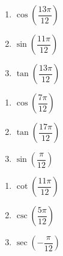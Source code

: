 \begin{multicols}{3}

\begin{enumerate}

\setcounter{enumi}{\value{HW}}

\item  $\cos\left(\dfrac{13\pi}{12}\right)$
\item  $\sin\left(\dfrac{11\pi}{12}\right)$
\item  $\tan\left(\dfrac{13\pi}{12}\right)$

\setcounter{HW}{\value{enumi}}

\end{enumerate}

\end{multicols}

\begin{multicols}{3}

\begin{enumerate}

\setcounter{enumi}{\value{HW}}

\item \label{cos7pi12} $\cos \left( \dfrac{7\pi}{12} \right)$
\item $\tan \left( \dfrac{17\pi}{12} \right)$
\item \label{sinpi12} $\sin \left( \dfrac{\pi}{12} \right)$ 

\setcounter{HW}{\value{enumi}}

\end{enumerate}

\end{multicols}

\begin{multicols}{3}

\begin{enumerate}

\setcounter{enumi}{\value{HW}}

\item $\cot \left( \dfrac{11\pi}{12} \right)$
\item $\csc \left( \dfrac{5\pi}{12} \right)$
\item $\sec \left( -\dfrac{\pi}{12} \right)$  \label{sumdifflast}

\setcounter{HW}{\value{enumi}}

\end{enumerate}

\end{multicols}

